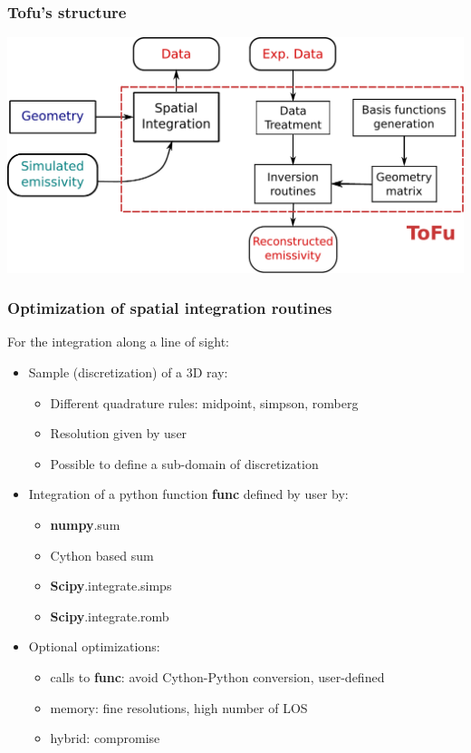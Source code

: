 \documentclass[10pt]{beamer}
\begin{document}
\begin{frame}
\frametitle{Tofu's structure}

\begin{center}
    	\includegraphics[width=0.8\linewidth]{figures/tofu.pdf}
\end{center}
	
\end{frame}



\begin{frame}
\frametitle{Optimization of spatial integration routines}

For the integration along a line of sight:

	\begin{itemize}
	\item Sample (discretization) of a 3D ray:
		\begin{itemize}
		\item Different quadrature rules: midpoint, simpson, romberg
		\item Resolution given by user
		\item Possible to define a sub-domain of discretization
		\end{itemize}
	\item Integration of a python function \textbf{func} defined by user by:
		\begin{itemize}
		\item \textbf{numpy}.sum
		\item Cython based sum
		\item \textbf{Scipy}.integrate.simps
		\item \textbf{Scipy}.integrate.romb
		\end{itemize}
	\item Optional optimizations:
		\begin{itemize}
		\item calls to \textbf{func}: avoid Cython-Python conversion, user-defined
		\item memory: fine resolutions, high number of LOS
		\item hybrid: compromise
		\end{itemize}
	\end{itemize}
	
\end{frame}
\end{document}
